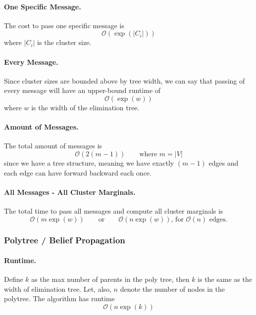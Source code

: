 \documentclass[11pt]{article}
\begin{document}
\paragraph{One Specific Message.} The cost to pass one specific message is
\begin{equation}
	\mathcal O (\exp ( |C_i|)) 
\end{equation}
where $|C_i|$ is the cluster size. 

\paragraph{Every Message.} Since cluster sizes are bounded above by tree width, we can say that passing of every message will have an upper-bound runtime of
\begin{equation}
	\mathcal O ( \exp (w) )
\end{equation}
where $w$ is the width of the elimination tree. 

\paragraph{Amount of Messages.} The total amount of messages is 
\begin{equation}
	\mathcal O (2 (m - 1)) \quad \quad \text{where $m = |V|$}
\end{equation}
since we have a tree structure, meaning we have exactly $(m - 1)$ edges and each edge can have forward backward each once. 

\paragraph{All Messages - All Cluster Marginals.} The total time to pass all messages and compute all cluster marginals is 
\begin{equation}
	\mathcal O (m \exp (w)) \quad \quad \text{or} \quad \quad \mathcal O (n \exp( w))\text{, for $\mathcal O (n)$ edges.} 
\end{equation}

\subsubsection{Polytree / Belief Propagation}
\paragraph{Runtime.} Define $k$ as the max number of parents in the poly tree, then $k$ is the same as the width of elimination tree. Let, also, $n$ denote the number of nodes in the polytree. The algorithm has runtime 
\begin{equation}
	\mathcal O (n \exp (k))
\end{equation}
\end{document}
